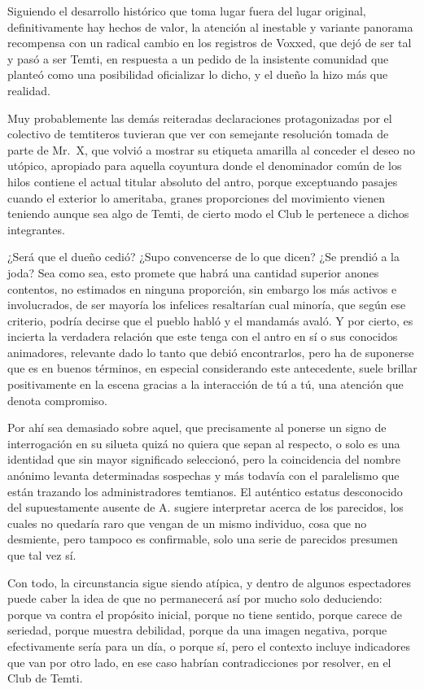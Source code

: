 \documentclass[
]{book}
\begin{document}
Siguiendo el desarrollo histórico que toma lugar fuera del lugar original, definitivamente hay hechos de valor, la atención al inestable y variante panorama recompensa con un radical cambio en los registros de Voxxed, que dejó de ser tal y pasó a ser Temti, en respuesta a un pedido de la insistente comunidad que planteó como una posibilidad oficializar lo dicho, y el dueño la hizo más que realidad.

Muy probablemente las demás reiteradas declaraciones protagonizadas por el colectivo de temtiteros tuvieran que ver con semejante resolución tomada de parte de Mr.~X, que volvió a mostrar su etiqueta amarilla al conceder el deseo no utópico, apropiado para aquella coyuntura donde el denominador común de los hilos contiene el actual titular absoluto del antro, porque exceptuando pasajes cuando el exterior lo ameritaba, granes proporciones del movimiento vienen teniendo aunque sea algo de Temti, de cierto modo el Club le pertenece a dichos integrantes.

¿Será que el dueño cedió? ¿Supo convencerse de lo que dicen? ¿Se prendió a la joda? Sea como sea, esto promete que habrá una cantidad superior anones contentos, no estimados en ninguna proporción, sin embargo los más activos e involucrados, de ser mayoría los infelices resaltarían cual minoría, que según ese criterio, podría decirse que el pueblo habló y el mandamás avaló. Y por cierto, es incierta la verdadera relación que este tenga con el antro en sí o sus conocidos animadores, relevante dado lo tanto que debió encontrarlos, pero ha de suponerse que es en buenos términos, en especial considerando este antecedente, suele brillar positivamente en la escena gracias a la interacción de tú a tú, una atención que denota compromiso.

Por ahí sea demasiado sobre aquel, que precisamente al ponerse un signo de interrogación en su silueta quizá no quiera que sepan al respecto, o solo es una identidad que sin mayor significado seleccionó, pero la coincidencia del nombre anónimo levanta determinadas sospechas y más todavía con el paralelismo que están trazando los administradores temtianos. El auténtico estatus desconocido del supuestamente ausente de A. sugiere interpretar acerca de los parecidos, los cuales no quedaría raro que vengan de un mismo individuo, cosa que no desmiente, pero tampoco es confirmable, solo una serie de parecidos presumen que tal vez sí.

Con todo, la circunstancia sigue siendo atípica, y dentro de algunos espectadores puede caber la idea de que no permanecerá así por mucho solo deduciendo: porque va contra el propósito inicial, porque no tiene sentido, porque carece de seriedad, porque muestra debilidad, porque da una imagen negativa, porque efectivamente sería para un día, o porque sí, pero el contexto incluye indicadores que van por otro lado, en ese caso habrían contradicciones por resolver, en el Club de Temti.
\end{document}
